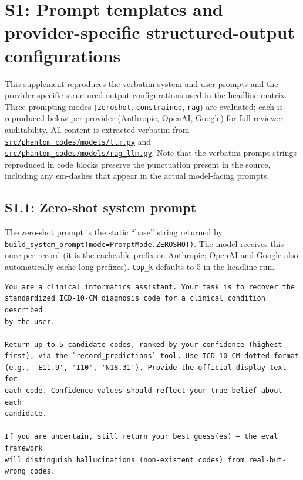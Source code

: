 \section{S1: Prompt templates and provider-specific structured-output configurations}\label{s1-prompt-templates-and-provider-specific-structured-output-configurations}

This supplement reproduces the verbatim system and user prompts and
the provider-specific structured-output configurations used in the
headline matrix. Three prompting modes (\texttt{zeroshot}, \texttt{constrained},
\texttt{rag}) are evaluated; each is reproduced below per provider
(Anthropic, OpenAI, Google) for full reviewer auditability. All
content is extracted verbatim from
\href{https://github.com/ufbfung/phantom-codes/blob/main/src/phantom_codes/models/llm.py}{\texttt{src/phantom\_codes/models/llm.py}}
and
\href{https://github.com/ufbfung/phantom-codes/blob/main/src/phantom_codes/models/rag_llm.py}{\texttt{src/phantom\_codes/models/rag\_llm.py}}.
Note that the verbatim prompt strings reproduced in code blocks
preserve the punctuation present in the source, including any
em-dashes that appear in the actual model-facing prompts.

\subsection{S1.1: Zero-shot system prompt}\label{s1.1-zero-shot-system-prompt}

The zero-shot prompt is the static ``base'' string returned by
\texttt{build\_system\_prompt(mode=PromptMode.ZEROSHOT)}. The model receives
this once per record (it is the cacheable prefix on Anthropic; OpenAI
and Google also automatically cache long prefixes). \texttt{top\_k} defaults
to 5 in the headline run.

\begin{verbatim}
You are a clinical informatics assistant. Your task is to recover the
standardized ICD-10-CM diagnosis code for a clinical condition described
by the user.

Return up to 5 candidate codes, ranked by your confidence (highest
first), via the `record_predictions` tool. Use ICD-10-CM dotted format
(e.g., 'E11.9', 'I10', 'N18.31'). Provide the official display text for
each code. Confidence values should reflect your true belief about each
candidate.

If you are uncertain, still return your best guess(es) — the eval framework
will distinguish hallucinations (non-existent codes) from real-but-wrong codes.
\end{verbatim}

